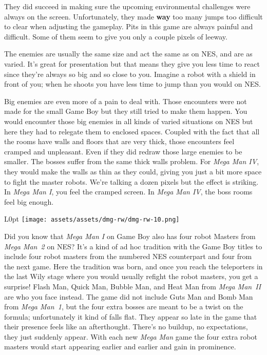 \documentclass{book}
\let\oldcenter\center
\let\oldendcenter\endcenter
\renewenvironment{center}{\setlength\topsep{0pt}\oldcenter}{\oldendcenter}
\begin{document}
They did succeed in making sure the upcoming environmental challenges were always on the screen. Unfortunately, they made \textbf{way} too many jumps too difficult to clear when adjusting the gameplay. Pits in this game are always painful and difficult. Some of them seem to give you only a couple pixels of leeway.

The enemies are usually the same size and act the same as on NES, and are as varied. It’s great for presentation but that means they give you less time to react since they’re always so big and so close to you. Imagine a robot with a shield in front of you; when he shoots you have less time to jump than you would on NES.

\begin{center}
\vspace{8pt}
\quad\vspace{4pt}
\end{center}
Big enemies are even more of a pain to deal with. Those encounters were not made for the small Game Boy but they still tried to make them happen. You would encounter those big enemies in all kinds of varied situations on NES but here they had to relegate them to enclosed spaces. Coupled with the fact that all the rooms have walls and floors that are very thick, those encounters feel cramped and unpleasant. Even if they did redraw those large enemies to be smaller. The bosses suffer from the same thick walls problem. For \emph{Mega Man IV}, they would make the walls as thin as they could, giving you just a bit more space to fight the master robots. We’re talking a dozen pixels but the effect is striking. In \emph{Mega Man I}, you feel the cramped screen. In \emph{Mega Man IV}, the boss rooms feel big enough.

\begin{wrapfigure}{L}{0pt} \texttt{[image: assets/assets/dmg-rw/dmg-rw-10.png]}\end{wrapfigure}
Did you know that \emph{Mega Man I} on Game Boy also has four robot Masters from \emph{Mega Man 2} on NES? It’s a kind of ad hoc tradition with the Game Boy titles to include four robot masters from the numbered NES counterpart and four from the next game. Here the tradition was born, and once you reach the teleporters in the last Wily stage where you would usually refight the robot masters, you get a surprise! Flash Man, Quick Man, Bubble Man, and Heat Man from \emph{Mega Man II} are who you face instead. The game did not include Guts Man and Bomb Man from \emph{Mega Man 1}, but the four extra bosses are meant to be a twist on the formula; unfortunately it kind of falls flat. They appear so late in the game that their presence feels like an afterthought. There’s no buildup, no expectations, they just suddenly appear. With each new \emph{Mega Man} game the four extra robot masters would start appearing earlier and earlier and gain in prominence.
\end{document}
